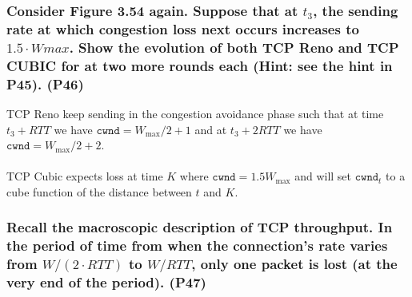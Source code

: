 \subsubsection{Consider Figure 3.54 again. Suppose that at $t_3$, the sending rate at which congestion loss next occurs increases to $1.5 \cdot Wmax$. Show the evolution of both TCP Reno and TCP CUBIC for at two more rounds each (Hint: see the hint in P45). (P46)}

TCP Reno keep sending in the congestion avoidance phase such that at time $t_3 + RTT$ we have $\texttt{cwnd} = W_{\max}/2 + 1$ and at $t_3 + 2 RTT$ we have $\texttt{cwnd} = W_{\max}/2 + 2$. \\
\\
TCP Cubic expects loss at time $K$ where $\texttt{cwnd} = 1.5 W_{\max}$ and will set $\texttt{cwnd}_t$ to a cube function of the distance between $t$ and $K$.


\subsubsection{Recall the macroscopic description of TCP throughput. In the period of time from when the connection's rate varies from $W/(2 \cdot RTT)$ to $W/RTT$, only one packet is lost (at the very end of the period). (P47)}

